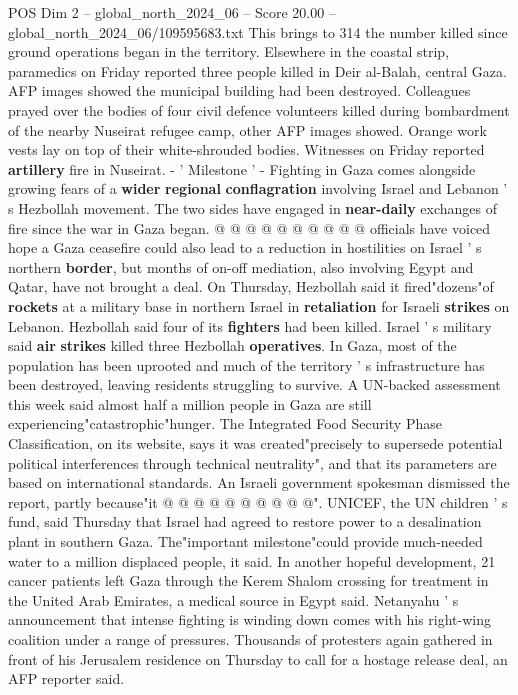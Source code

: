 \begin{textsample}{POS Dim 2 – global\_north\_2024\_06 – Score 20.00 – global\_north\_2024\_06/109595683.txt}
This brings to 314 the number killed since ground operations began in the territory.
Elsewhere in the coastal strip, paramedics on Friday reported three people killed in Deir al-Balah, central Gaza.
AFP images showed the municipal building had been destroyed.
Colleagues prayed over the bodies of four civil defence volunteers killed during bombardment of the nearby Nuseirat refugee camp, other AFP images showed.
Orange work vests lay on top of their white-shrouded bodies.
Witnesses on Friday reported \textbf{artillery} fire in Nuseirat. - ' Milestone ' - Fighting in Gaza comes alongside growing fears of a \textbf{wider} \textbf{regional} \textbf{conflagration} involving Israel and Lebanon ' s Hezbollah movement.
The two sides have engaged in \textbf{near-daily} exchanges of fire since the war in Gaza began. @ @ @ @ @ @ @ @ @ @ officials have voiced hope a Gaza ceasefire could also lead to a reduction in hostilities on Israel ' s northern \textbf{border}, but months of on-off mediation, also involving Egypt and Qatar, have not brought a deal.
On Thursday, Hezbollah said it fired"dozens"of \textbf{rockets} at a military base in northern Israel in \textbf{retaliation} for Israeli \textbf{strikes} on Lebanon.
Hezbollah said four of its \textbf{fighters} had been killed.
Israel ' s military said \textbf{air} \textbf{strikes} killed three Hezbollah \textbf{operatives}.
In Gaza, most of the population has been uprooted and much of the territory ' s infrastructure has been destroyed, leaving residents struggling to survive.
A UN-backed assessment this week said almost half a million people in Gaza are still experiencing"catastrophic"hunger.
The Integrated Food Security Phase Classification, on its website, says it was created"precisely to supersede potential political interferences through technical neutrality", and that its parameters are based on international standards.
An Israeli government spokesman dismissed the report, partly because"it @ @ @ @ @ @ @ @ @ @".
UNICEF, the UN children ' s fund, said Thursday that Israel had agreed to restore power to a desalination plant in southern Gaza.
The"important milestone"could provide much-needed water to a million displaced people, it said.
In another hopeful development, 21 cancer patients left Gaza through the Kerem Shalom crossing for treatment in the United Arab Emirates, a medical source in Egypt said.
Netanyahu ' s announcement that intense fighting is winding down comes with his right-wing coalition under a range of pressures.
Thousands of protesters again gathered in front of his Jerusalem residence on Thursday to call for a hostage release deal, an AFP reporter said.

\end{textsample}
